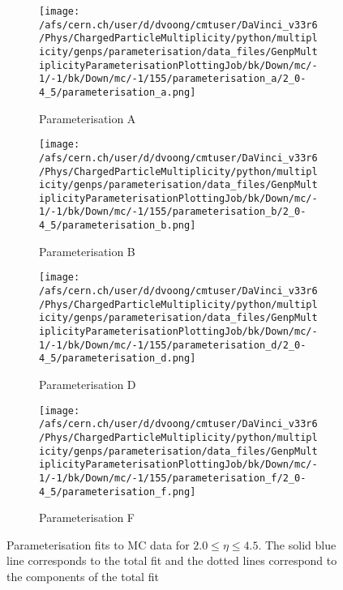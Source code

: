 \begin{figure}[H]
	\centering
	\begin{subfigure}{0.49\textwidth}
		\texttt{[image: /afs/cern.ch/user/d/dvoong/cmtuser/DaVinci\_v33r6/Phys/ChargedParticleMultiplicity/python/multiplicity/genps/parameterisation/data\_files/GenpMultiplicityParameterisationPlottingJob/bk/Down/mc/-1/-1/bk/Down/mc/-1/155/parameterisation\_a/2\_0-4\_5/parameterisation\_a.png]}
		\caption{Parameterisation A}
		\label{}
	\end{subfigure}
	\begin{subfigure}{0.49\textwidth}
		\texttt{[image: /afs/cern.ch/user/d/dvoong/cmtuser/DaVinci\_v33r6/Phys/ChargedParticleMultiplicity/python/multiplicity/genps/parameterisation/data\_files/GenpMultiplicityParameterisationPlottingJob/bk/Down/mc/-1/-1/bk/Down/mc/-1/155/parameterisation\_b/2\_0-4\_5/parameterisation\_b.png]}
		\caption{Parameterisation B}
		\label{}
	\end{subfigure}
	\begin{subfigure}{0.49\textwidth}
		\texttt{[image: /afs/cern.ch/user/d/dvoong/cmtuser/DaVinci\_v33r6/Phys/ChargedParticleMultiplicity/python/multiplicity/genps/parameterisation/data\_files/GenpMultiplicityParameterisationPlottingJob/bk/Down/mc/-1/-1/bk/Down/mc/-1/155/parameterisation\_d/2\_0-4\_5/parameterisation\_d.png]}
		\caption{Parameterisation D}
		\label{}
	\end{subfigure}
	\begin{subfigure}{0.49\textwidth}
		\texttt{[image: /afs/cern.ch/user/d/dvoong/cmtuser/DaVinci\_v33r6/Phys/ChargedParticleMultiplicity/python/multiplicity/genps/parameterisation/data\_files/GenpMultiplicityParameterisationPlottingJob/bk/Down/mc/-1/-1/bk/Down/mc/-1/155/parameterisation\_f/2\_0-4\_5/parameterisation\_f.png]}
		\caption{Parameterisation F}
		\label{}
	\end{subfigure}
	\caption{Parameterisation fits to MC data for $2.0 \le \eta \le 4.5$. The solid blue line corresponds to the total fit and the dotted lines correspond to the components of the total fit}
	\label{fig: parameterisation fits}
\end{figure}

